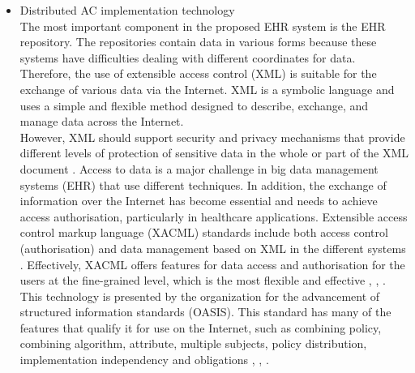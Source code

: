 \documentclass[journal,article,submit,moreauthors,pdftex]{Definitions/mdpi}
\begin{document}
\begin{itemize}
\begin{figure}[ht!]
\begin{minipage}{.5\textwidth}
  \label{fig:abac}
\end{minipage}
\end{figure}
In recent years, there has been significant interest in using the attribute-based access control (ABAC) model for the protection of data privacy. This model is designed to access data more accurately (fine-grained) and securely. It handles user attributes (such as name, address, age, mobile, location, time) to allow users to access the server's repository. ABAC proposed to go beyond the limitations in the rules and design of the most well-known control access models (DAC, MAC, and RBAC) \cite{fp19}, \cite{fp30}. ABAC is a rich model because it deals with a wide range of user attributes. ABAC supports administration, authorisation of context-aware, risk-intelligence, and scalability in various applications such as the Internet, IoT, Big Data, cloud computing, and VANET \cite{fp28}. The attributes in ABAC are categorized into subject, object, action, and environment. As shown in Figure~\ref{fig:abac}, each user has a set of attributes that allows him/her to access data in the server.\\
\item Distributed AC implementation technology\\
The most important component in the proposed EHR system is the EHR repository. The repositories contain data in various forms because these systems have difficulties dealing with different coordinates for data. Therefore, the use of extensible access control (XML) is suitable for the exchange of various data via the Internet. XML is a symbolic language and uses a simple and flexible method designed to describe, exchange, and manage data across the Internet.\\
However, XML should support security and privacy mechanisms that provide different levels of protection of sensitive data in the whole or part of the XML document \cite{fp17}. Access to data is a major challenge in big data management systems (EHR) that use different techniques. In addition, the exchange of information over the Internet has become essential and needs to achieve access authorisation, particularly in healthcare applications. Extensible access control markup language (XACML) standards include both access control (authorisation) and data management based on XML in the different systems \cite{fp20}. Effectively, XACML offers features for data access and authorisation for the users at the fine-grained level, which is the most flexible and effective \cite{fp27}, \cite{fp29}, \cite{fp31}. This technology is presented by the organization for the advancement of structured information standards (OASIS). This standard has many of the features that qualify it for use on the Internet, such as combining policy, combining algorithm, attribute, multiple subjects, policy distribution, implementation independency and obligations \cite{fp30}, \cite{fp31}, \cite{fp21}.


\end{itemize}
\end{document}
